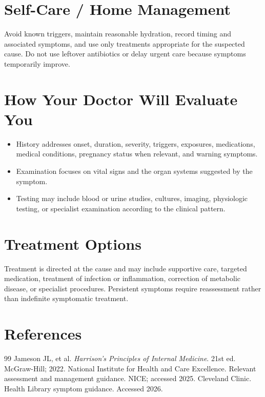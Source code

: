 \section*{Self-Care / Home Management}
Avoid known triggers, maintain reasonable hydration, record timing and associated symptoms, and use only treatments appropriate for the suspected cause. Do not use leftover antibiotics or delay urgent care because symptoms temporarily improve.

\section*{How Your Doctor Will Evaluate You}
\begin{itemize}
  \item History addresses onset, duration, severity, triggers, exposures, medications, medical conditions, pregnancy status when relevant, and warning symptoms.
  \item Examination focuses on vital signs and the organ systems suggested by the symptom.
  \item Testing may include blood or urine studies, cultures, imaging, physiologic testing, or specialist examination according to the clinical pattern.
\end{itemize}

\section*{Treatment Options}
Treatment is directed at the cause and may include supportive care, targeted medication, treatment of infection or inflammation, correction of metabolic disease, or specialist procedures. Persistent symptoms require reassessment rather than indefinite symptomatic treatment.

\section*{References}
\begin{thebibliography}{99}
 Jameson JL, et al. \textit{Harrison's Principles of Internal Medicine}. 21st ed. McGraw-Hill; 2022.
 National Institute for Health and Care Excellence. Relevant assessment and management guidance. NICE; accessed 2025.
 Cleveland Clinic. Health Library symptom guidance. Accessed 2026.
\end{thebibliography}
